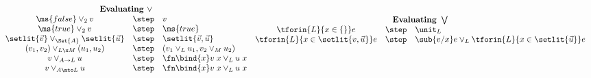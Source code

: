 \begin{figure*}
\begin{displaymath}
\begin{array}{ccl}
      \vspace{1em}\\
      \multicolumn{3}{c}{\textbf{Evaluating }\vee}\\
      \ms{false} \vee_2 v &\step& v\\
      \ms{true} \vee_2 v &\step& \ms{true}\\
      \setlit{\vec{v}} \vee_{\Set{A}} \setlit{\vec{u}} &\step& \setlit{\vec{v}, \vec{u}}\\
      (v_1, v_2) \vee_{L \x M} (u_1, u_2) &\step& (v_1 \vee_L u_1, v_2 \vee_M u_2)\\
      v \vee_{A \to L} u &\step& \fn\bind{x} v\;x \vee_L u\;x\\
      v \vee_{A \mto L} u &\step& \fn\bind{x} v\;x \vee_L u\;x

    \end{array}
    \begin{array}{ccl}

      \multicolumn{3}{c}{\textbf{Evaluating }\bigvee}\\
      \tforin{L}{x \in \{\}} e &\step& \unit_L\\
      \tforin{L}{x \in \setlit{v, \vec{u}}} e
      &\step& \sub{v/x} e \vee_L \tforin{L}{x \in \setlit{\vec{u}}} e


\end{array}
\end{displaymath}
\end{figure*}
